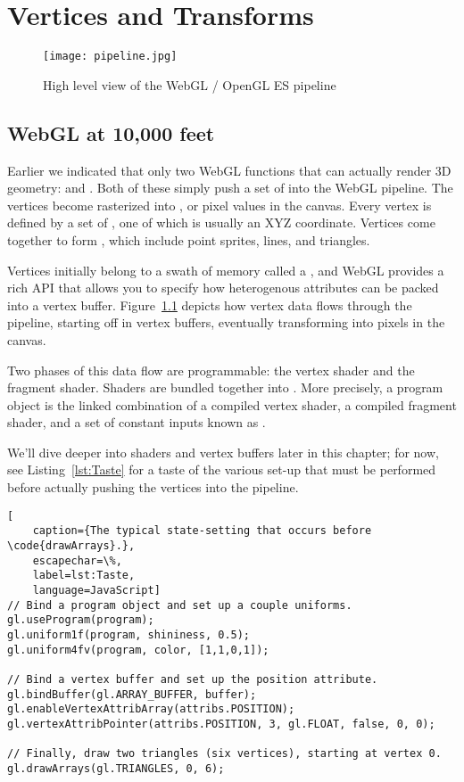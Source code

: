 \chapter{Vertices and Transforms}

\begin{figure}[htb]\centering
  \texttt{[image: pipeline.jpg]}
  \caption{High level view of the WebGL / OpenGL ES pipeline}
  \label{fig:AssemblyLine}
\end{figure}

\section{WebGL at 10,000 feet}

Earlier we indicated that only two WebGL functions that can actually render 3D geometry:  and .  Both of these simply push a set of   into the WebGL pipeline.  The vertices become rasterized into  , or pixel values in the canvas.  Every vertex is defined by a set of , one of which is usually an XYZ coordinate.  Vertices come together to form , which include point sprites, lines, and triangles.

Vertices initially belong to a swath of memory called a , and WebGL provides a rich API that allows you to specify how heterogenous attributes can be packed into a vertex buffer.  Figure~\ref{fig:AssemblyLine} depicts how vertex data flows through the pipeline, starting off in vertex buffers, eventually transforming into pixels in the canvas.

Two phases of this data flow are programmable: the vertex shader and the fragment shader.  Shaders are bundled together into  .   More precisely, a program object is the linked combination of a compiled vertex shader, a compiled fragment shader, and a set of constant inputs known as .

We'll dive deeper into shaders and vertex buffers later in this chapter; for now, see Listing~\ref{lst:Taste} for a taste of the various set-up that must be performed before actually pushing the vertices into the pipeline.

\begin{lstlisting}[
    caption={The typical state-setting that occurs before \code{drawArrays}.},
    escapechar=\%,
    label=lst:Taste,
    language=JavaScript]
// Bind a program object and set up a couple uniforms.
gl.useProgram(program);
gl.uniform1f(program, shininess, 0.5);
gl.uniform4fv(program, color, [1,1,0,1]);

// Bind a vertex buffer and set up the position attribute.
gl.bindBuffer(gl.ARRAY_BUFFER, buffer);
gl.enableVertexAttribArray(attribs.POSITION);
gl.vertexAttribPointer(attribs.POSITION, 3, gl.FLOAT, false, 0, 0);

// Finally, draw two triangles (six vertices), starting at vertex 0.
gl.drawArrays(gl.TRIANGLES, 0, 6);
\end{lstlisting}


